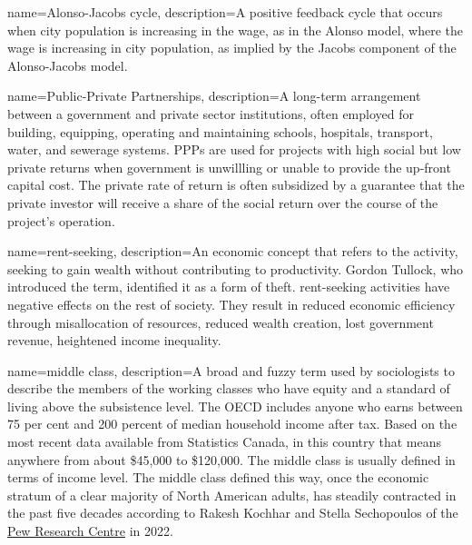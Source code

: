 {
name=Alonso-Jacobs cycle,
description={A positive \gls{feedback} cycle that occurs when city population is increasing in the wage, as in the Alonso model, where the wage is increasing in city population, as implied by the Jacobs component of the \gls{Alonso-Jacobs model}.}
}

{
name=Public-Private Partnerships,
description={A long-term arrangement between a government and private sector institutions, often  employed for building, equipping, operating and maintaining schools, hospitals, transport, water, and sewerage systems. PPPs are used for projects with high social but low private returns when government is unwillling or unable to provide the up-front capital cost. The private rate of return is often subsidized by a guarantee that the private investor will receive a share of the social return over the course of the project's operation.}
}

{
name=rent-seeking,
description={An economic concept that refers to the activity, seeking to gain wealth without contributing to productivity. Gordon Tullock, who introduced  the term, identified it as a form of theft\cite{tullockWelfareCostsTariffs1967}.  %
\Gls{rent-seeking} activities have negative effects on the rest of society. They result in reduced economic efficiency through misallocation of resources, reduced wealth creation, lost government revenue, heightened income inequality.}
}

{
name=middle class,
description={A broad and fuzzy term used by sociologists to describe the members of the working classes who have equity and a standard of living above the subsistence level. The OECD includes anyone who earns between 75 per cent and 200 percent of median household income after tax. Based on the most recent data available from Statistics Canada, in this country that means anywhere from about \$45,000 to \$120,000. The middle class is usually defined in terms of income level. The middle class defined this way, once the economic stratum of a clear majority of North American adults, has steadily contracted in the past five decades according to
Rakesh Kochhar and  Stella Sechopoulos of the \href{https://www.pewresearch.org/fact-tank/2022/04/20/how-the-american-middle-class-has-changed-in-the-past-five-decades/}{Pew Research Centre}  in 2022.}
}

